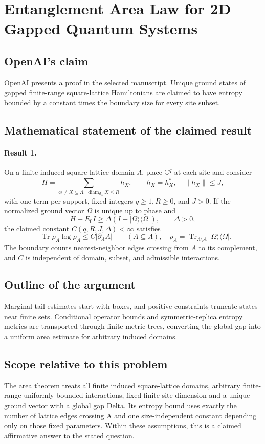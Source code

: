 \documentclass[11pt]{article}
\begin{document}
\section*{Entanglement Area Law for 2D Gapped Quantum Systems}

\subsection{OpenAI's claim}
OpenAI presents a proof in the selected manuscript. Unique ground states of gapped finite-range square-lattice Hamiltonians are claimed to have entropy bounded by a constant times the boundary size for every site subset.

\subsection{Mathematical statement of the claimed result}
\paragraph{Result 1.} On a finite induced square-lattice domain \(\Lambda\), place \(\mathbb C^q\) at each site and consider
\[
 H=\sum_{\varnothing\ne X\subseteq\Lambda,\ \operatorname{diam}_{d_\Lambda}X\le R}h_X,
 \qquad h_X=h_X^*,\quad\|h_X\|\le J,
\]
with one term per support, fixed integers \(q\ge1,R\ge0\), and \(J>0\). If the normalized ground vector \(\Omega\) is unique up to phase and
\[
 H-E_0I\ge\Delta(I-|\Omega\rangle\langle\Omega|),\qquad\Delta>0,
\]
the claimed constant \(C(q,R,J,\Delta)<\infty\) satisfies
\[
 -\operatorname{Tr}\rho_A\log\rho_A\le C|\partial_\Lambda A|
 \qquad(A\subseteq\Lambda),\quad
 \rho_A=\operatorname{Tr}_{\Lambda\setminus A}|\Omega\rangle\langle\Omega|.
\]
The boundary counts nearest-neighbor edges crossing from \(A\) to its complement, and \(C\) is independent of domain, subset, and admissible interactions.

\subsection{Outline of the argument}
Marginal tail estimates start with boxes, and positive constraints truncate states near finite sets. Conditional operator bounds and symmetric-replica entropy metrics are transported through finite metric trees, converting the global gap into a uniform area estimate for arbitrary induced domains.

\subsection{Scope relative to this problem}
The area theorem treats all finite induced square-lattice domains, arbitrary finite-range uniformly bounded interactions, fixed finite site dimension and a unique ground vector with a global gap Delta. Its entropy bound uses exactly the number of lattice edges crossing A and one size-independent constant depending only on those fixed parameters. Within these assumptions, this is a claimed affirmative answer to the stated question.
\end{document}
